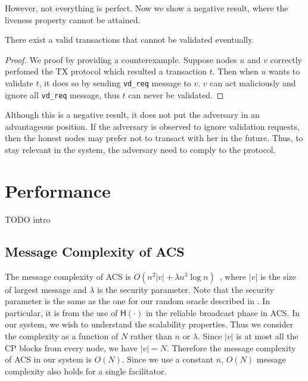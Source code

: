 However, not everything is perfect.
Now we show a negative result, where the liveness property cannot be attained.
\begin{lemma}
There exist a valid transactions that cannot be validated eventually.
\end{lemma}
\begin{proof}
We proof by providing a counterexample.
Suppose nodes $u$ and $v$ correctly perfomed the TX protocol which resulted a transaction $t$.
Then when $u$ wants to validate $t$, it does so by sending \texttt{vd\_req} message to $v$.
$v$ can act maliciously and ignore all \texttt{vd\_req} message, thus $t$ can never be validated.
\end{proof}
Although this is a negative result, it does not put the adversary in an advantageous position.
If the adversary is observed to ignore validation requests, then the honest nodes may prefer not to transact with her in the future.
Thus, to stay relevant in the system, the adversary need to comply to the protocol.


\section{Performance}
TODO intro

\subsection{Message Complexity of ACS}
\label{sec:acs-complexity}
The message complexity of ACS is $O(n^2|v| + \lambda n^3 \log n)$~\cite{miller2016honey},
where $|v|$ is the size of largest message and $\lambda$ is the security parameter.
Note that the security parameter is the same as the one for our random oracle described in .
In particular, it is from the use of $\textsf{H}(\cdot)$ in the reliable broadcast phase in ACS.
In our system, we wish to understand the scalability properties.
Thus we consider the complexity as a function of $N$ rather than $n$ or $\lambda$.
Since $|v|$ is at most all the CP blocks from every node, we have $|v| = N$.
Therefore the message complexity of ACS in our system is $O(N)$.
Since we use a constant $n$, $O(N)$ message complexity also holds for a single facilitator.


